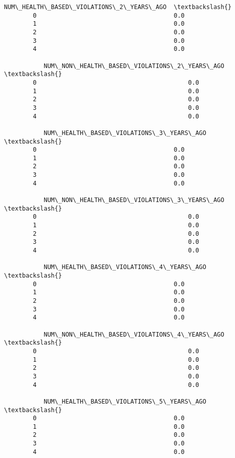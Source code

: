 \documentclass[11pt]{article}
\begin{document}
\begin{Verbatim}[commandchars=\\\{\}]
           NUM\_HEALTH\_BASED\_VIOLATIONS\_2\_YEARS\_AGO  \textbackslash{}
        0                                      0.0   
        1                                      0.0   
        2                                      0.0   
        3                                      0.0   
        4                                      0.0   
        
           NUM\_NON\_HEALTH\_BASED\_VIOLATIONS\_2\_YEARS\_AGO  \textbackslash{}
        0                                          0.0   
        1                                          0.0   
        2                                          0.0   
        3                                          0.0   
        4                                          0.0   
        
           NUM\_HEALTH\_BASED\_VIOLATIONS\_3\_YEARS\_AGO  \textbackslash{}
        0                                      0.0   
        1                                      0.0   
        2                                      0.0   
        3                                      0.0   
        4                                      0.0   
        
           NUM\_NON\_HEALTH\_BASED\_VIOLATIONS\_3\_YEARS\_AGO  \textbackslash{}
        0                                          0.0   
        1                                          0.0   
        2                                          0.0   
        3                                          0.0   
        4                                          0.0   
        
           NUM\_HEALTH\_BASED\_VIOLATIONS\_4\_YEARS\_AGO  \textbackslash{}
        0                                      0.0   
        1                                      0.0   
        2                                      0.0   
        3                                      0.0   
        4                                      0.0   
        
           NUM\_NON\_HEALTH\_BASED\_VIOLATIONS\_4\_YEARS\_AGO  \textbackslash{}
        0                                          0.0   
        1                                          0.0   
        2                                          0.0   
        3                                          0.0   
        4                                          0.0   
        
           NUM\_HEALTH\_BASED\_VIOLATIONS\_5\_YEARS\_AGO  \textbackslash{}
        0                                      0.0   
        1                                      0.0   
        2                                      0.0   
        3                                      0.0   
        4                                      0.0   
        

\end{Verbatim}
\end{document}
